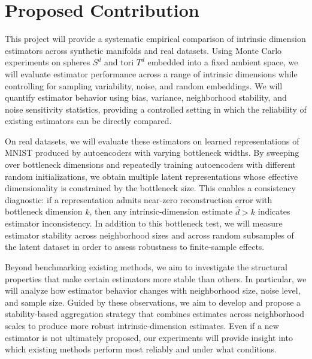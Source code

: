 \documentclass[11pt]{article}
\begin{document}
\section*{Proposed Contribution}

This project will provide a systematic empirical comparison of intrinsic dimension estimators across synthetic manifolds and real datasets. Using Monte Carlo experiments on spheres $S^d$ and tori $T^d$ embedded into a fixed ambient space, we will evaluate estimator performance across a range of intrinsic dimensions while controlling for sampling variability, noise, and random embeddings. We will quantify estimator behavior using bias, variance, neighborhood stability, and noise sensitivity statistics, providing a controlled setting in which the reliability of existing estimators can be directly compared.

On real datasets, we will evaluate these estimators on learned representations of MNIST produced by autoencoders with varying bottleneck widths. By sweeping over bottleneck dimensions and repeatedly training autoencoders with different random initializations, we obtain multiple latent representations whose effective dimensionality is constrained by the bottleneck size. This enables a consistency diagnostic: if a representation admits near-zero reconstruction error with bottleneck dimension $k$, then any intrinsic-dimension estimate $\hat d > k$ indicates estimator inconsistency. In addition to this bottleneck test, we will measure estimator stability across neighborhood sizes and across random subsamples of the latent dataset in order to assess robustness to finite-sample effects.

Beyond benchmarking existing methods, we aim to investigate the structural properties that make certain estimators more stable than others. In particular, we will analyze how estimator behavior changes with neighborhood size, noise level, and sample size. Guided by these observations, we aim to develop and propose a stability-based aggregation strategy that combines estimates across neighborhood scales to produce more robust intrinsic-dimension estimates. Even if a new estimator is not ultimately proposed, our experiments will provide insight into which existing methods perform most reliably and under what conditions.


\end{document}
